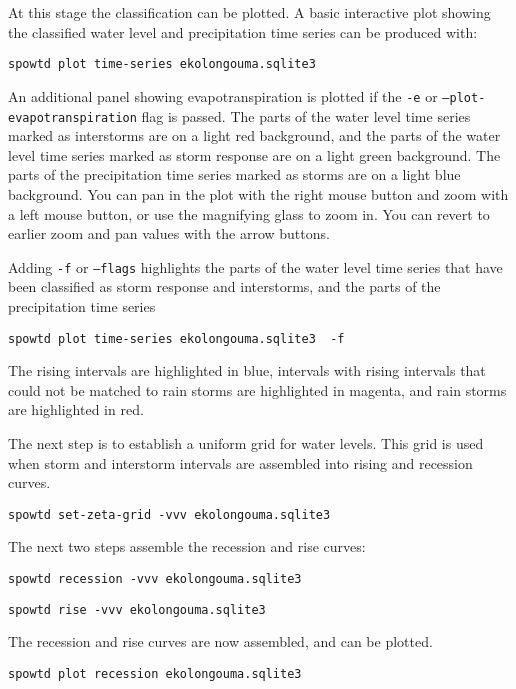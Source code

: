 \documentclass[11pt,a4paper]{article}
\begin{document}
At this stage the classification can be plotted.  A basic interactive
plot showing the classified water level and precipitation time series
can be produced with:
\begin{lstlisting}[frame=single]
spowtd plot time-series ekolongouma.sqlite3
\end{lstlisting}
An additional panel showing evapotranspiration is plotted if the
\texttt{-e} or \texttt{--plot-evapotranspiration} flag is passed.  The
parts of the water level time series marked as interstorms are on a
light red background, and the parts of the water level time series
marked as storm response are on a light green background.  The parts
of the precipitation time series marked as storms are on a light blue
background.  You can pan in the plot with the right mouse button and
zoom with a left mouse button, or use the magnifying glass to zoom in.
You can revert to earlier zoom and pan values with the arrow buttons.

Adding \texttt{-f} or \texttt{--flags} highlights the parts of the
water level time series that have been classified as storm response
and interstorms, and the parts of the precipitation time series
\begin{lstlisting}[frame=single]
spowtd plot time-series ekolongouma.sqlite3  -f
\end{lstlisting}
The rising intervals are highlighted in blue, intervals with rising
intervals that could not be matched to rain storms are highlighted in
magenta, and rain storms are highlighted in red.

The next step is to establish a uniform grid for water levels.  This
grid is used when storm and interstorm intervals are assembled into
rising and recession curves.
\begin{lstlisting}[frame=single]
spowtd set-zeta-grid -vvv ekolongouma.sqlite3
\end{lstlisting}

The next two steps assemble the recession and rise curves:
\begin{lstlisting}[frame=single]
spowtd recession -vvv ekolongouma.sqlite3
\end{lstlisting}

\begin{lstlisting}[frame=single]
spowtd rise -vvv ekolongouma.sqlite3
\end{lstlisting}

The recession and rise curves are now assembled, and can be plotted.
\begin{lstlisting}[frame=single]
spowtd plot recession ekolongouma.sqlite3
\end{lstlisting}
\end{document}
